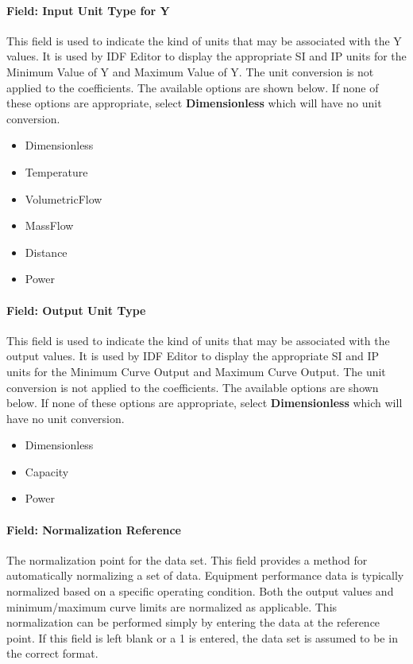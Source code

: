 \paragraph{Field: Input Unit Type for Y}\label{field-input-unit-type-for-y-000}

This field is used to indicate the kind of units that may be associated with the Y values. It is used by IDF Editor to display the appropriate SI and IP units for the Minimum Value of Y and Maximum Value of Y. The unit conversion is not applied to the coefficients. The available options are shown below. If none of these options are appropriate, select \textbf{Dimensionless} which will have no unit conversion.

\begin{itemize}
\item
  Dimensionless
\item
  Temperature
\item
  VolumetricFlow
\item
  MassFlow
\item
  Distance
\item
  Power
\end{itemize}

\paragraph{Field: Output Unit Type}\label{field-output-unit-type-1-000}

This field is used to indicate the kind of units that may be associated with the output values. It is used by IDF Editor to display the appropriate SI and IP units for the Minimum Curve Output and Maximum Curve Output. The unit conversion is not applied to the coefficients. The available options are shown below. If none of these options are appropriate, select \textbf{Dimensionless} which will have no unit conversion.

\begin{itemize}
\item
  Dimensionless
\item
  Capacity
\item
  Power
\end{itemize}

\paragraph{Field: Normalization Reference}\label{field-normalization-reference-1}

The normalization point for the data set. This field provides a method for automatically normalizing a set of data. Equipment performance data is typically normalized based on a specific operating condition. Both the output values and minimum/maximum curve limits are normalized as applicable. This normalization can be performed simply by entering the data at the reference point. If this field is left blank or a 1 is entered, the data set is assumed to be in the correct format.

